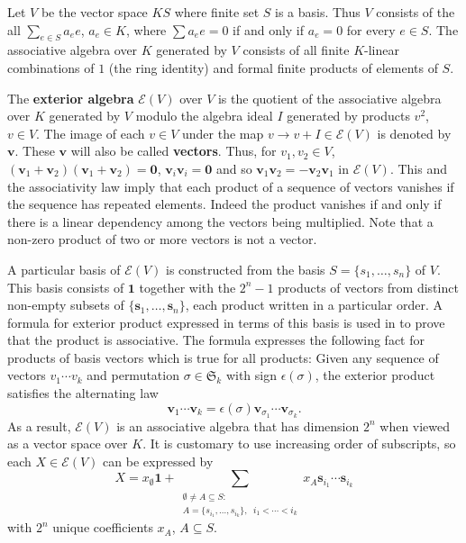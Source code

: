 \documentclass[12pt]{article}
\theoremstyle{definition}
\newcommand{\FieldK}{\ensuremath{K}}
\newcommand{\Perms}{\ensuremath{\mathfrak{S}}}
\newcommand{\ext}[1]{\ensuremath{\mathbf{#1}}}
\begin{document}
Let $V$ be the vector space $\FieldK S$
where finite set $S$ is a basis.  Thus $V$ consists of the
all $\sum_{e\in S}a_e e$, $a_e\in\FieldK$, where
$\sum a_e e = 0$ if and only if $a_e=0$ for every $e\in S$.
The associative algebra over $\FieldK$ generated by $V$ consists
of all finite $\FieldK$-linear combinations of $1$ (the ring identity) and
formal finite products of elements of $S$.


The \textbf{exterior algebra} $\mathcal{E}(V)$ over $V$ is the 
quotient of the associative algebra over $\FieldK$ generated by 
$V$ modulo the algebra ideal $I$ generated by products $v^2$, $v\in V$.  
The image of each $v\in V$ under the map $v\rightarrow v+I\in\mathcal{E}(V)$
is denoted by $\ext{v}$.  These $\ext{v}$ will also be called \textbf{vectors}. 
Thus, for $v_1, v_2\in V$, 
$(\ext{v}_1+\ext{v}_2)(\ext{v}_1+\ext{v}_2)=\ext{0}$,
$\ext{v}_i\ext{v}_i=\ext{0}$ and so $\ext{v}_1\ext{v}_2=-\ext{v}_2\ext{v}_1$ 
in $\mathcal{E}(V)$.  This and
the associativity law imply that each product of a sequence of 
vectors vanishes if the sequence has repeated elements.  Indeed the
product vanishes if and only if there is a linear dependency among
the vectors being multiplied.  Note that a non-zero product of two or more
vectors is not a vector.

A particular basis of $\mathcal{E}(V)$ 
is constructed
from the basis $S=\{s_1, \ldots, s_n\}$ of $V$.  This basis consists
of $\mathbf{1}$ together with the $2^n-1$ products of vectors from 
distinct non-empty subsets of $\{\ext{s}_1, \ldots, \ext{s}_n\}$, each
product written in a particular order.  A formula for exterior
product expressed in terms of this basis is used in \cite{JacobsonI}
to prove that the product is associative.  The formula expresses the
following fact for products of basis vectors which is true for all
products:
Given any sequence of vectors $v_1\cdots v_k$
and permutation $\sigma\in\Perms_k$ with
sign $\epsilon(\sigma)$, the exterior product satisfies the alternating law
\[
\ext{v}_1\cdots\ext{v}_k=\epsilon(\sigma)\ext{v}_{\sigma_1}\cdots\ext{v}_{\sigma_k}.
\]
As a result, $\mathcal{E}(V)$ is an associative algebra
that has dimension $2^n$ when viewed as a vector space over $\FieldK$.  
It is customary to use increasing
order of subscripts, so each $X\in\mathcal{E}(V)$ can be expressed by
\[
X = x_{\emptyset}\mathbf{1} + \sum_{\substack{\emptyset\neq A\subseteq S :\\
                           A=\{s_{i_1},\ldots,s_{i_k}\},\;\;  i_1 < \cdots < i_k}}
                         x_A \ext{s}_{i_1}\cdots\ext{s}_{i_k}
\]
with $2^n$ unique coefficients $x_A$, $A\subseteq S$.
\end{document}
